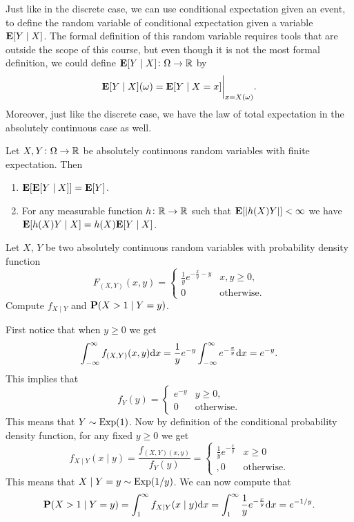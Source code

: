 \documentclass[11pt,a4paper]{article}
\begin{document}
\begin{remark}
  Just like in the discrete case,
  we can use conditional expectation given an event,
  to define the random variable of conditional expectation
  given a variable $\mathbf{E}[Y \mid X]$.
  The formal definition of this random variable requires tools that
  are outside the scope of this course,
  but even though it is not the most formal definition,
  we could define $\mathbf{E}[Y \mid X] \colon \Omega \to \mathbb{R}$ by
  \[
    \mathbf{E}[Y \mid X](\omega) =
    \mathbf{E}[Y \mid X = x] \biggr\vert_{x = X(\omega)}.
  \]
  Moreover, just like the discrete case,
  we have the law of total expectation in the absolutely continuous
  case as well.
\end{remark}

\begin{proposition}
  Let $X,Y \colon \Omega \to \mathbb{R}$ be absolutely continuous random variables with
  finite expectation.
  Then
  \begin{enumerate}
    \item[(1)] $\mathbf{E}[\mathbf{E}[Y \mid X]] = \mathbf{E}[Y]$.
    \item[(2)] For any measurable function $h \colon \mathbb{R} \to \mathbb{R}$ such that
      $\mathbf{E}[|h(X) Y|] < \infty$ we have $\mathbf{E}[h(X) Y \mid X] = h(X) \mathbf{E}[Y \mid X]$.
  \end{enumerate}
\end{proposition}

\begin{exercise}
  Let $X$, $Y$ be two absolutely continuous random variables
  with probability density function
  \[
    F_{(X,Y)}(x,y) =
    \begin{cases}
      \frac{1}{y} e^{- \frac{x}{y} - y} &x,y \geq 0, \\
      0 &\text{otherwise}.
    \end{cases}
  \]
  Compute $f_{X \mid Y}$ and $\mathbf{P}(X > 1 \mid Y = y)$.
\end{exercise}
\begin{solution}
  First notice that when $y \geq 0$ we get
  \[
    \int_{-\infty}^{\infty} f_{(X,Y)}(x,y) \dx =
    \frac{1}{y} e^{-y} \int_{-\infty}^{\infty} e^{- \frac{x}{y}} \dx =
    e^{-y}.
  \]
  This implies that
  \[
    f_{Y}(y) =
    \begin{cases}
      e^{-y} &y \geq 0, \\
      0 &\text{otherwise}.
    \end{cases}
  \]
  This means that $Y \sim \operatorname{Exp}(1)$.
  Now by definition of the conditional probability density function,
  for any fixed $y \geq 0$ we get
  \[
    f_{X \mid Y}(x \mid y) =
    \frac{f_{(X,Y)(x,y)}}{f_Y(y)} =
    \begin{cases}
      \frac{1}{y} e^{- \frac{x}{y}} &x \geq 0 \\,
      0 &\text{otherwise}.
    \end{cases}
  \]
  This means that $X \mid Y = y \sim \operatorname{Exp}(1/y)$.
  We can now compute that
  \[
    \Prob(X > 1 \mid Y = y) =
    \int_{1}^{\infty} f_{X \mid Y}(x \mid y) \dx =
    \int_{1}^{\infty} \frac{1}{y} e^{- \frac{x}{y}} \dx =
    e^{-1/y}.
  \]
\end{solution}
\end{document}
